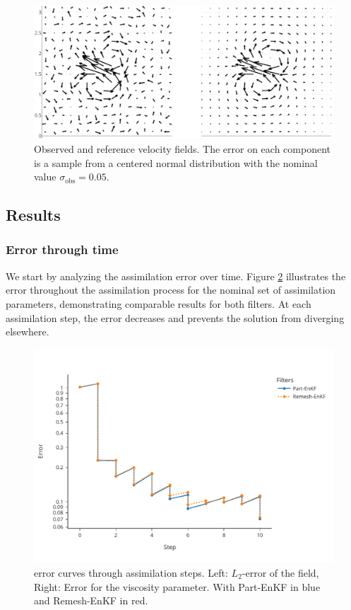 \begin{figure}[htbp]
	\centering
	\includegraphics[width=0.8\linewidth]{images/app2d/velocity_ref_recadre.pdf}
	\caption{Observed and reference velocity fields. The error on each component is a sample from a centered normal distribution with the nominal value $\sigma_{\text{obs}} = 0.05$.}
	\label{fig:velocity}
\end{figure}

\newpage

\subsection{Results}

\subsubsection{Error through time}

We start by analyzing the assimilation error over time. Figure \ref{fig:assim_time} illustrates the error throughout the assimilation process for the nominal set of assimilation parameters, demonstrating comparable results for both filters. At each assimilation step, the error decreases and prevents the solution from diverging elsewhere.

\begin{figure}[htbp]
	\centering
	\includegraphics*[width=0.7\linewidth]{images/app2d/final/error_in_time.pdf}
	\caption{error curves through assimilation steps. Left: \(L_2\)-error of the field, Right: Error for the viscosity parameter. With Part-EnKF in blue and Remesh-EnKF in red.}
	\label{fig:assim_time}
\end{figure}

